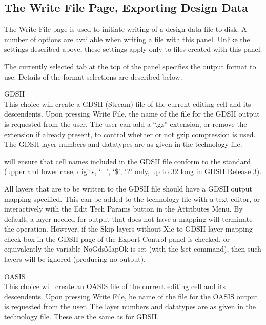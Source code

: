 \subsection{The Write File Page, Exporting Design Data}

The {\cb Write File} page is used to initiate writing of a design data
file to disk.  A number of options are available when writing a file
with this panel.  Unlike the settings described above, these settings
apply only to files created with this panel.

The currently selected tab at the top of the panel specifies the
output format to use.  Details of the format selections are described
below.

\begin{description}
\item{\cb GDSII}\\
This choice will create a GDSII (Stream) file of the current editing
cell and its descendents.  Upon pressing {\cb Write File}, the name of
the file for the GDSII output is requested from the user.  The user
can add a ``{\vt .gz}'' extension, or remove the extension if already
present, to control whether or not {\vt gzip} compression is used. 
The GDSII layer numbers and datatypes are as given in the technology
file.

{\Xic} will ensure that cell names included in the GDSII file
conform to the standard (upper and lower case, digits, `\_', `\$', `?'
only, up to 32 long in GDSII Release 3).

All layers that are to be written to the GDSII file should have a
GDSII output mapping specified.  This can be added to the technology
file with a text editor, or interactively with the {\cb Edit Tech
Params} button in the {\cb Attributes Menu}.  By default, a layer
needed for output that does not have a mapping will terminate the
operation.  However, if the {\cb Skip layers without Xic to GDSII
layer mapping} check box in the {\cb GDSII} page of the {\cb Export
Control} panel is checked, or equivalently the variable {\et
NoGdsMapOk} is set (with the {\cb !set} command), then such layers
will be ignored (producing no output).

\item{\cb OASIS}\\
This choice will create an OASIS file of the current editing cell and
its descendents.  Upon pressing {\cb Write File}, he name of the file
for the OASIS output is requested from the user.  The layer numbers
and datatypes are as given in the technology file.  These are the same
as for GDSII.


\end{description}

